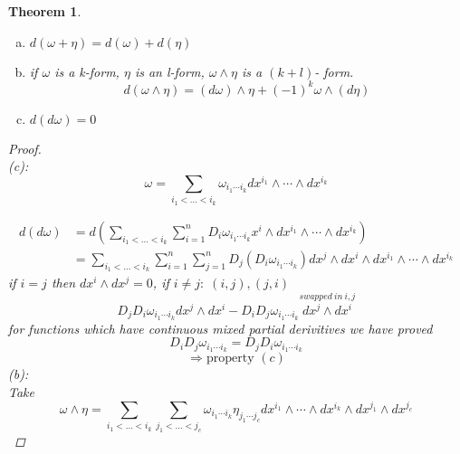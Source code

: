 \documentclass[11pt]{article}
\newtheorem{theorem}{Theorem}[section]
\begin{document}
\begin{theorem}\quad \\
\begin{enumerate}[(a)]
\item $d(\omega + \eta) = d(\omega) + d(\eta)$
\item if $\omega$ is a k-form,  $\eta$ is an l-form,  $\omega\wedge\eta$ is a $(k+l)$- form.
\[d(\omega\wedge\eta) = (d\omega)\wedge\eta + (-1)^k\omega\wedge(d\eta)\]
\item $d(d\omega) = 0$
\end{enumerate}

\begin{proof}\quad\\
(c):
\[\omega = \sum\limits_{i_1<\dots <i_k}\omega_{i_1\cdots i_k}dx^{i_1}\wedge\cdots\wedge dx^{i_k}\]

\begin{align*}
d(d\omega) &= d\left(\sum\limits_{i_1<\dots <i_k}\sum\limits_{i=1}^n D_i\omega_{i_1\cdots i_k}x^i\wedge dx^{i_1}\wedge\cdots\wedge dx^{i_k}\right)\\
&=\sum\limits_{i_1<\dots <i_k}\sum\limits_{i=1}^n\sum\limits_{j=1}^n D_j\left( D_i\omega_{i_1\cdots i_k}\right)dx^j\wedge dx^i\wedge dx^{i_1}\wedge\cdots\wedge dx^{i_k}
\end{align*}
if $i=j$ then $dx^i\wedge dx^j =0$, if $i \neq j: \; (i,j) , (j,i)$
\[  D_jD_i\omega_{i_1\cdots i_k}dx^j\wedge dx^i -D_iD_j\omega_{i_1\cdots i_k}\overset{swapped\: in\: i,j}{ dx^j\wedge dx^i}\]
for functions which have continuous mixed partial derivitives we have proved 
\[D_iD_j\omega_{i_1\cdots i_k}= D_jD_i\omega_{i_1\cdots i_k}\]
\[\Rightarrow \text{property }(c)\]
(b):\quad \\
Take
\[\omega\wedge\eta = \sum\limits_{i_1<\dots <i_k} \sum\limits_{j_1<\dots <j_c}\omega_{i_1\cdots i_k}\eta_{j_1\cdots j_c}dx^{i_1}\wedge\cdots\wedge dx^{i_k}\wedge dx^{j_1}\wedge dx^{j_c}\]




\end{proof}
\end{theorem}
\end{document}
